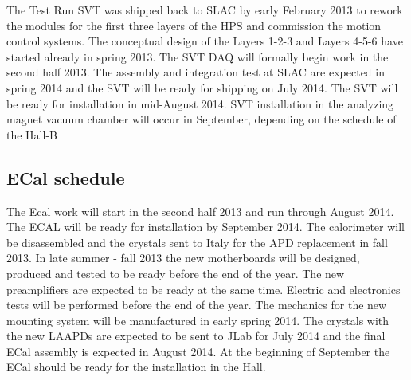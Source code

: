 \documentclass[11pt]{report}
\begin{document}
The Test Run SVT was shipped back to SLAC by early February 2013 to 
rework the modules for the first three layers of the HPS and commission the motion control systems. The conceptual design of the 
Layers 1-2-3 and Layers 4-5-6 have started already in spring 2013. 
The SVT DAQ will formally begin work in  the second half 2013.
 The assembly and integration test at SLAC are expected in spring 2014 and the SVT will 
be ready for shipping on July 2014. The SVT will be ready for installation in mid-August 2014. SVT  installation in the analyzing 
magnet vacuum chamber will occur in September, depending on the schedule of the Hall-B
\subsection{ECal schedule}
The Ecal work will start in the second half 2013 and run through August 2014. The ECAL will be ready for installation by September 2014.
The calorimeter will be disassembled and the crystals sent to Italy for the APD replacement in fall 2013.
In late summer - fall 2013 the new motherboards will be designed, produced and tested to be ready before the end of the year. 
The new preamplifiers are expected to be ready at the same time. Electric and electronics tests will be performed before the end of the year.
The mechanics for the new mounting system will be manufactured in early spring 2014. The crystals with the new LAAPDs are expected to be sent to JLab for July 2014 and the final 
ECal assembly is expected in August 2014. At the beginning of  September  the ECal should be ready for the installation in the Hall.
\end{document}
